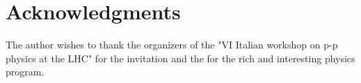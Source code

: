 \documentclass{PoS}
\begin{document}

\section{Acknowledgments}
The author wishes to thank the organizers of the "VI Italian workshop on p-p physics at the LHC" 
for the invitation and the for the rich and interesting physics program.



\end{document}
